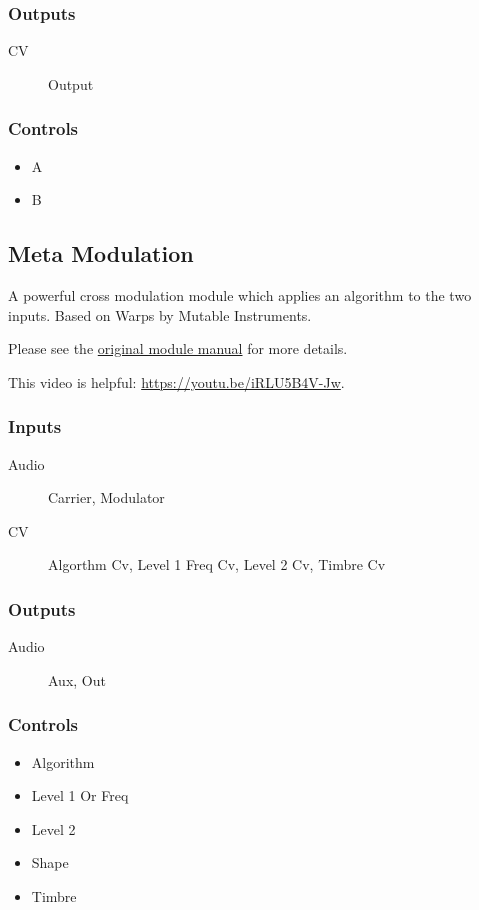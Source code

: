 \subsubsection{Outputs}
\begin{description}
\item [CV] Output
\end{description}

\subsubsection{Controls}
\begin{itemize}
\item A
\item B
\end{itemize}

\subsection{Meta Modulation}

A powerful cross modulation module which applies an algorithm to the two inputs. Based on Warps by Mutable Instruments.



Please see the \href{https://www.mutable-instruments.net/modules/warps/manual/}{original module manual} for more details.

This video is helpful: \url{https://youtu.be/iRLU5B4V-Jw}.

\subsubsection{Inputs}
\begin{description}
\item [Audio] Carrier, Modulator
\item [CV] Algorthm Cv, Level 1 Freq Cv, Level 2 Cv, Timbre Cv
\end{description}

\subsubsection{Outputs}
\begin{description}
\item [Audio] Aux, Out
\end{description}

\subsubsection{Controls}
\begin{itemize}
\item Algorithm
\item Level 1 Or Freq
\item Level 2
\item Shape
\item Timbre
\end{itemize}

